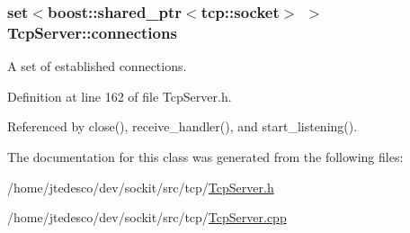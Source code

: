 \hypertarget{classTcpServer_a1beafdc19eb3f4e18fb811057afe5f6d}{
\subsubsection[{connections}]{\setlength{\rightskip}{0pt plus 5cm}set$<$boost::shared\_\-ptr$<$tcp::socket$>$ $>$ {\bf TcpServer::connections}}}
\label{classTcpServer_a1beafdc19eb3f4e18fb811057afe5f6d}
A set of established connections. 

Definition at line 162 of file TcpServer.h.



Referenced by close(), receive\_\-handler(), and start\_\-listening().



The documentation for this class was generated from the following files:\begin{DoxyCompactItemize}
\item 
/home/jtedesco/dev/sockit/src/tcp/\hyperlink{TcpServer_8h}{TcpServer.h}\item 
/home/jtedesco/dev/sockit/src/tcp/\hyperlink{TcpServer_8cpp}{TcpServer.cpp}\end{DoxyCompactItemize}
